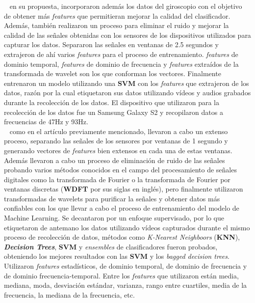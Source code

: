 ~\parencite{seraj2015roads} en su propuesta, incorporaron además los datos del giroscopio con el objetivo de obtener más \emph{features} que permitieran mejorar la calidad
del clasificador. Además, también realizaron un proceso para eliminar el ruido y mejorar la calidad de las señales obtenidas con los sensores de los dispositivos
utilizados para capturar los datos. Separaron las señales en ventanas de 2.5 segundos y extrajeron de ahí varios \emph{features} para el proceso de entrenamiento.
\emph{features} de dominio temporal, \emph{features} de dominio de frecuencia y \emph{features} extraídos de la transformada de wavelet son los que conforman los vectores.
Finalmente entrenaron un modelo utilizando una \textbf{SVM} con los \emph{features} que extrajeron de los datos, razón por la cual etiquetaron sus datos utilizando vídeos
y audios grabados durante la recolección de los datos. El dispositivo que utilizaron para la recolección de los datos fue un Samsung Galaxy S2 y recopilaron datos a
frecuencias de 47Hz y 93Hz.\\

~\parencite{el2018towards} como en el artículo previamente mencionado, llevaron a cabo un extenso proceso, separando las señales de los sensores por
ventanas de 1 segundo y generando vectores de \emph{features} bien extensos en cada una de estas ventanas. Además llevaron a cabo un proceso de eliminación de ruido
de las señales probando varios métodos conocidos en el campo del procesamiento de señales digitales como la transformada de Fourier o la transformada de
Fourier por ventanas discretas (\textbf{WDFT} por sus siglas en inglés), pero finalmente utilizaron transformadas de wavelets para purificar la señales y obtener
datos más confiables con los que llevar a cabo el proceso de entrenamiento del modelo de Machine Learning. Se decantaron por un enfoque supervisado, por lo que 
etiquetaron de antemano los datos utilizando vídeos capturados durante el mismo proceso de recolección de datos, métodos como \emph{K-Nearest Neighboors} (\textbf{KNN}),
\emph{\textbf{Decision Trees}}, \textbf{SVM} y \emph{ensembles} de clasificadores fueron probados, obteniendo los mejores resultados con las \textbf{SVM} y los
\emph{bagged decision trees}. Utilizaron \emph{features} estadísticos, de dominio temporal, de dominio de frecuencia y de dominio frecuencia-temporal. Entre los
\emph{features} que utilizaron están media, mediana, moda, desviación estándar, varianza, rango entre cuartiles, media de la frecuencia, la mediana de la frecuencia,
etc.\\

